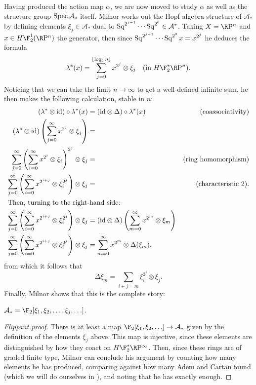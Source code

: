 Having produced the action map $\alpha$, we are now moved to study $\alpha$ as well as the structure group $\operatorname{Spec} \mathcal A_*$ itself.  Milnor works out the Hopf algebra structure of $\mathcal A_*$ by defining elements $\xi_j \in \mathcal A_*$ dual to $\operatorname{Sq}^{2^{j-1}} \cdots \operatorname{Sq}^{2^0} \in \mathcal A^*$.  Taking $X = \RP^n$ and $x \in H\F_2^1(\RP^n)$ the generator, then since $\operatorname{Sq}^{2^{j-1}} \cdots \operatorname{Sq}^{2^0} x = x^{2^j}$ he deduces the formula \[\lambda^*(x) = \sum_{j=0}^{\lfloor \log_2 n \rfloor} x^{2^j} \otimes \xi_j \text{\quad (in $H\F_2^* \RP^n$)}.\]  Noticing that we can take the limit $n \to \infty$ to get a well-defined infinite sum, he then makes the following calculation, stable in $n$:
\begin{align*}
(\lambda^* \otimes \mathrm{id}) \circ \lambda^*(x) & = (\mathrm{id} \otimes \Delta) \circ \lambda^*(x) & \text{(coassociativity)} \\
(\lambda^* \otimes \mathrm{id}) \left( \sum_{j=0}^\infty x^{2^j} \otimes \xi_j \right) & = \\
\sum_{j=0}^\infty \left( \sum_{i=0}^\infty x^{2^i} \otimes \xi_i \right)^{2^j} \otimes \xi_j & = & \text{(ring homomorphism)} \\
\sum_{j=0}^\infty \left( \sum_{i=0}^\infty x^{2^{i+j}} \otimes \xi_i^{2^j} \right) \otimes \xi_j & = & \text{(characteristic $2$)}. \\
\intertext{Then, turning to the right-hand side:}
\sum_{j=0}^\infty \left( \sum_{i=0}^\infty x^{2^{i+j}} \otimes \xi_i^{2^j} \right) \otimes \xi_j & = (\mathrm{id} \otimes \Delta) \left( \sum_{m=0}^\infty x^{2^m} \otimes \xi_m \right) \\
\sum_{j=0}^\infty \left( \sum_{i=0}^\infty x^{2^{i+j}} \otimes \xi_i^{2^j} \right) \otimes \xi_j & = \sum_{m=0}^\infty x^{2^m} \otimes \Delta(\xi_m),
\end{align*}
from which it follows that \[\Delta \xi_m = \sum_{i+j=m} \xi_i^{2^j} \otimes \xi_j.\]  Finally, Milnor shows that this is the complete story:
\begin{theorem}
$\mathcal A_* = \F_2[\xi_1, \xi_2, \ldots, \xi_j, \ldots]$.
\end{theorem}
\begin{proof}[Flippant proof]
There is at least a map $\F_2[\xi_1, \xi_2, \ldots] \to \mathcal A_*$ given by the definition of the elements $\xi_j$ above.  This map is injective, since these elements are distinguished by how they coact on $H\F_2^* \RP^\infty$.  Then, since these rings are of graded finite type, Milnor can conclude his argument by counting how many elements he has produced, comparing against how many Adem and Cartan found (which we will do ourselves in ), and noting that he has exactly enough.
\end{proof}

